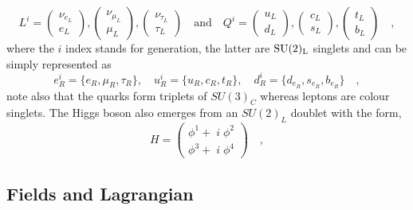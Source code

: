 \begin{equation}
L^i= \begin{pmatrix}
\nu_{e_L} \\ e_L 
\end{pmatrix},
\begin{pmatrix}
\nu_{\mu_L} \\ \mu_L 
\end{pmatrix},
\begin{pmatrix}
\nu_{\tau_L} \\ \tau_L 
\end{pmatrix} 
\quad 
\text{and} \quad Q^i= \begin{pmatrix}
u_{L} \\
d_L 
\end{pmatrix},\begin{pmatrix}
c_{L} \\
s_L 
\end{pmatrix}
,\begin{pmatrix}
t_{L} \\
b_L 
\end{pmatrix} \quad ,
\end{equation}
where the $i$ index stands for generation, the latter are $\mathrm{SU}(2)_{\mathrm{L}}$ singlets and can be simply represented as
%
 \begin{equation}
e^i_R=\{e_R,\mu_R,\tau_R\}, \quad  u^i_R=\{u_R,c_R,t_R\}, \quad d^i_R=\{d_{e_R},s_{e_R},b_{e_R}\} \quad , 
\end{equation}
%
note also that the quarks form triplets of $SU(3)_C$ whereas leptons are colour singlets. The Higgs boson also emerges from an $SU(2)_L$ doublet with the form,
%
\begin{equation}
H=\begin{pmatrix}
\phi^1 + \; i \; \phi^2 \\
\phi^3 + \; i \; \phi^4  
\end{pmatrix} \quad , 
\end{equation}
%
%
%
\subsection{Fields and Lagrangian}

